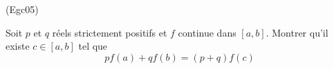 \begin{tiny}(Egc05)\end{tiny} Soit $p$ et $q$ réels strictement positifs et $f$ continue dans $[a,b]$. Montrer qu'il existe $c\in[a,b]$ tel que
\begin{displaymath}
 pf(a) + qf(b) = (p+q)f(c)
\end{displaymath}

